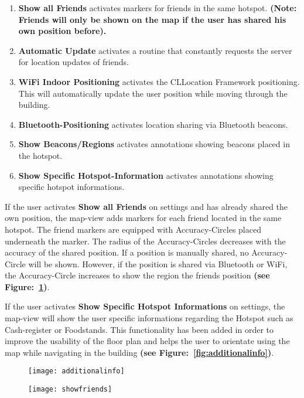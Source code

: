 \begin{enumerate}
  \item \textbf{Show all Friends} activates markers for friends in the same hotspot. \textbf{(Note: Friends will only be shown on the map if the user has shared his own position before).}
  \item \textbf{Automatic Update} activates a routine that constantly requests the server for location updates of friends.
  \item \textbf{WiFi Indoor Positioning} activates the CLLocation Framework positioning. This will automatically update the user position while moving through the building.
  \item \textbf{Bluetooth-Positioning} activates location sharing via Bluetooth beacons.
  \item \textbf{Show Beacons/Regions} activates annotations showing beacons placed in the hotspot.
  \item \textbf{Show Specific Hotspot-Information} activates annotations showing specific hotspot informations.
\end{enumerate}

If the user activates \textbf{Show all Friends} on settings and has already shared the own position, the map-view adds markers for each friend located in the same hotspot. The friend markers are equipped with Accuracy-Circles placed underneath the marker. The radius of the Accuracy-Circles decreases with the accuracy of the shared position. If a position is manually shared, no Accuracy-Circle will be shown. However, if the position is shared via Bluetooth or WiFi, the Accuracy-Circle increases to show the region the friends position \textbf{(see Figure:~\ref{fig:showfriends})}.

If the user activates \textbf{Show Specific Hotspot Informations} on settings, the map-view will show the user specific informations regarding the Hotspot such as Cash-register or Foodstands. This functionality has been added in order to improve the usability of the floor plan and helps the user to orientate using the map while navigating in the building \textbf{(see Figure:~\ref{fig:additionalinfo})}.

\begin{figure}
\centering
\begin{minipage}{.5\textwidth}
  \centering
  \texttt{[image: additionalinfo]}
  \label{fig:additionalinfo}
\end{minipage}%
\begin{minipage}{.5\textwidth}
  \centering
  \texttt{[image: showfriends]}
  \label{fig:showfriends}
\end{minipage}
\end{figure}


